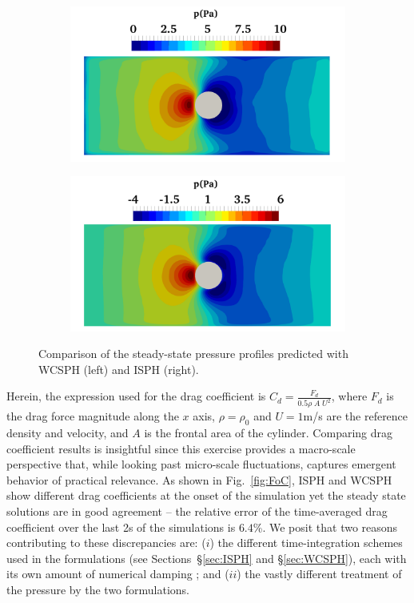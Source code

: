 \begin{figure}
	\centering    
	\begin{subfigure}{0.47\columnwidth}    
		\centering
		\includegraphics[width=1.0\textwidth]{images/SPH_Comparison/p_xsph.png}
	\end{subfigure}
	\begin{subfigure}{0.47\columnwidth}
		\centering
		\includegraphics[width=1.0\textwidth]{images/SPH_Comparison/p_isph.png}
	\end{subfigure}
	\caption{Comparison of the steady-state pressure profiles predicted with  WCSPH (left) and ISPH (right).}    \label{fig:FoCP}
\end{figure} 
Herein, the expression used for the drag coefficient is $C_d=\frac{F_d}{0.5\rho\;A\; U^2}$, where $F_d$ is the drag force magnitude along the $x$ axis, $\rho=\rho_0$ and $U=1$\si{m/s} are the reference density and velocity, and $A$ is the frontal area of the cylinder. Comparing drag coefficient results is insightful since this exercise provides a macro-scale perspective that, while looking past micro-scale fluctuations, captures emergent behavior of practical relevance. As shown in Fig.~\ref{fig:FoC}, ISPH and WCSPH show different drag coefficients at the onset of the simulation yet the steady state solutions are in good agreement -- the relative error of the time-averaged drag coefficient over the last 2\si{s} of the simulations is $6.4$\%. We posit that two reasons contributing to these discrepancies are: ($i$) the different time-integration schemes used in the formulations (see Sections~\S\ref{sec:ISPH} and \S\ref{sec:WCSPH}), each with its own amount of numerical damping \cite{hairer2009odeBook}; and ($ii$) the vastly different treatment of the pressure by the two formulations.

